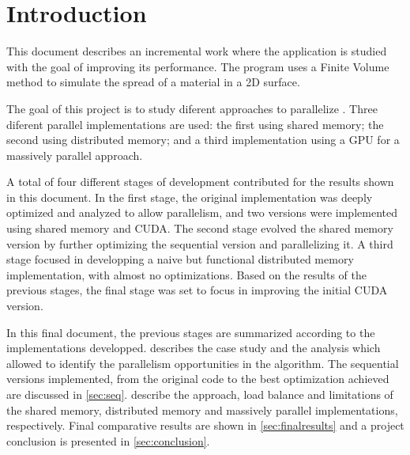 \section{Introduction}




This document describes an incremental work where the \polu application is studied with the goal of improving its performance. The program uses a Finite Volume method to simulate the spread of a material in a 2D surface.

The goal of this project is to study diferent approaches to parallelize \polu. Three diferent parallel implementations are used: the first using shared memory; the second using distributed memory; and a third implementation using a GPU for a massively parallel approach.

A total of four different stages of development contributed for the results shown in this document.
In the first stage, the original implementation was deeply optimized and analyzed to allow parallelism, and two versions were implemented using shared memory and CUDA.
The second stage evolved the shared memory version by further optimizing the sequential version and parallelizing it.
A third stage focused in developping a naive but functional distributed memory implementation, with almost no optimizations.
Based on the results of the previous stages, the final stage was set to focus in improving the initial CUDA version.

In this final document, the previous stages are summarized according to the implementations developped.  describes the case study and the analysis which allowed to identify the parallelism opportunities in the algorithm. The sequential versions implemented, from the original code to the best optimization achieved are discussed in \cref{sec:seq}.  describe the approach, load balance and limitations of the shared memory, distributed memory and massively parallel implementations, respectively.
Final comparative results are shown in \cref{sec:finalresults} and a project conclusion is presented in \cref{sec:conclusion}.

